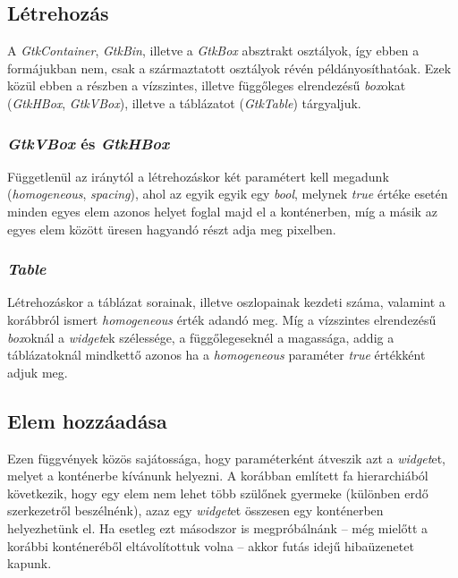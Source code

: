 \documentclass[a4paper,10pt]{article}
\begin{document}
\subsection{Létrehozás}

A \textit{GtkContainer}, \textit{GtkBin}, illetve a \textit{GtkBox} absztrakt osztályok, így ebben a formájukban nem, csak a származtatott osztályok révén példányosíthatóak. Ezek közül ebben a részben a vízszintes, illetve függőleges elrendezésű \textit{box}okat (\textit{GtkHBox}, \textit{GtkVBox}), illetve a táblázatot (\textit{GtkTable}) tárgyaljuk.

\subsubsection{\textit{GtkVBox} és \textit{GtkHBox}}

Függetlenül az iránytól a létrehozáskor két paramétert kell megadunk (\textit{homogeneous}, \textit{spacing}), ahol az egyik egyik egy \textit{bool}, melynek \textit{true} értéke esetén minden egyes elem azonos helyet foglal majd el a konténerben, míg a másik az egyes elem között üresen hagyandó részt adja meg pixelben.

\subsubsection{\textit{Table}}

Létrehozáskor a táblázat sorainak, illetve oszlopainak kezdeti száma, valamint a korábbról ismert \textit{homogeneous} érték adandó meg. Míg a vízszintes elrendezésű \textit{box}oknál a \textit{widget}ek szélessége, a függőlegeseknél a magassága, addig a táblázatoknál mindkettő azonos ha a \textit{homogeneous} paraméter \textit{true} értékként adjuk meg.

\subsection{Elem hozzáadása}

Ezen függvények közös sajátossága, hogy paraméterként átveszik azt a \textit{widget}et, melyet a konténerbe kívánunk helyezni. A korábban említett fa hierarchiából következik, hogy egy elem nem lehet több szülőnek gyermeke (különben erdő szerkezetről beszélnénk), azaz egy \textit{widget}et összesen egy konténerben helyezhetünk el. Ha esetleg ezt másodszor is megpróbálnánk -- még mielőtt a korábbi konténeréből eltávolítottuk volna -- akkor futás idejű hibaüzenetet kapunk.
\end{document}
